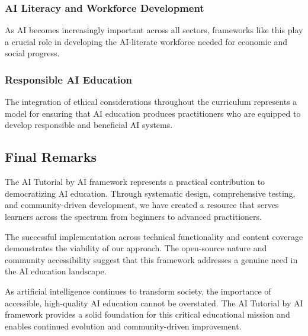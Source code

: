 \subsubsection{AI Literacy and Workforce Development}

As AI becomes increasingly important across all sectors, frameworks like this play a crucial role in developing the AI-literate workforce needed for economic and social progress.

\subsubsection{Responsible AI Education}

The integration of ethical considerations throughout the curriculum represents a model for ensuring that AI education produces practitioners who are equipped to develop responsible and beneficial AI systems.

\subsection{Final Remarks}

The AI Tutorial by AI framework represents a practical contribution to democratizing AI education. Through systematic design, comprehensive testing, and community-driven development, we have created a resource that serves learners across the spectrum from beginners to advanced practitioners.

The successful implementation across technical functionality and content coverage demonstrates the viability of our approach. The open-source nature and community accessibility suggest that this framework addresses a genuine need in the AI education landscape.

As artificial intelligence continues to transform society, the importance of accessible, high-quality AI education cannot be overstated. The AI Tutorial by AI framework provides a solid foundation for this critical educational mission and enables continued evolution and community-driven improvement.
